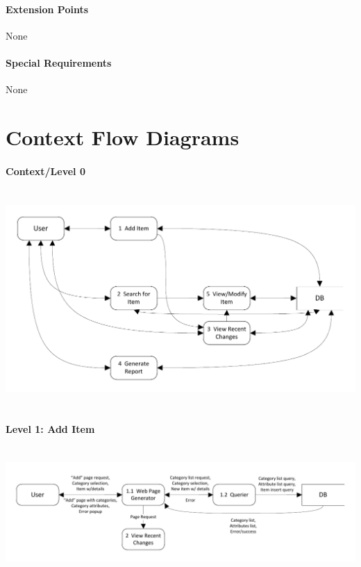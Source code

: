 \documentclass{article}
\begin{document}
\paragraph{Extension Points}
None

\paragraph{Special Requirements}
None


\section{Context Flow Diagrams}
\paragraph{Context/Level 0}
~\\
\includegraphics[keepaspectratio, width=6.5in]{dfd_context_level0.pdf}\\
~\\

\paragraph{Level 1: Add Item}
~\\
\includegraphics[keepaspectratio, width=6.5in]{dfd_level1_add_item.pdf}\\
~\\
\end{document}
